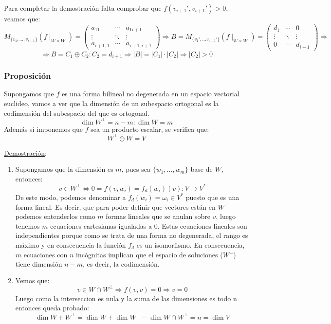 \documentclass[10pt,a4paper,openright]{book}
\begin{document}
\begin{itemize}
Para completar la demostración falta comprobar que $f(v_{i+1}',v_{i+1}')>0$, veamos que:
$$M_{\{v_1, ..., v_{i+1}\}}(f\mid_{W\times W}) = \begin{pmatrix} a_{11} & \cdots & a_{1i+1} \\ \vdots & \ddots & \vdots \\ a_{i+1,1} & \cdots & a_{i+1,i+1}\end{pmatrix}\Rightarrow B= M_{\{v_1', ... v_{i+1}'\}}(f\mid_{W\times W})=\begin{pmatrix} d_1 & \cdots & 0 \\ \vdots & \ddots & \vdots \\ 0 & \cdots & d_{i+1}\end{pmatrix}\Rightarrow$$
$$\Rightarrow B=C_1\oplus C_2: C_2 = d_{i+1}\Rightarrow |B| = |C_1| \cdot |C_2|\Rightarrow |C_2|>0$$
\end{itemize}

\subsubsection*{Proposición}
Supongamos que $f$ es una forma bilineal  no degenerada en un espacio vectorial euclideo, vamos a ver que la dimensión de un subespacio ortogonal es la codimensión del subespacio del que es ortogonal.
$$\dim W^\perp = n-m: \dim W = m$$
Además si imponemos que $f$ sea un producto escalar, se verifica que:
$$W^\perp \oplus W = V$$

\underline{Demostración}:
\begin{enumerate}
\item Supongamos que la dimensión es $m$, pues sea $\{w_1, ..., w_m\}$ base de $W$, entonces:
$$v\in W^\perp\Leftrightarrow 0 = f(v,w_i) = f_d(w_i)(v): V\rightarrow V^*$$
De este modo, podemos denominar a $f_d(w_i)=\omega_i\in V^*$ puesto que es una forma lineal. Es decir, que para poder definir que vectores están en $W^\perp$ podemos entenderlos como $m$ formas lineales que se anulan sobre $v$, luego tenemos $m$ ecuaciones cartesianas igualadas a 0. Estas ecuaciones lineales son independientes porque como se trata de una forma no degenerada, el rango es máximo y en consecuencia la función $f_d$ es un isomorfismo. En consecuencia, $m$ ecuaciones con $n$ incógnitas implican que el espacio de soluciones ($W^\perp$) tiene dimensión $n-m$, es decir, la codimensión.

\item Vemos que:
$$v\in W\cap W^\perp \Rightarrow f(v,v)=0\Rightarrow v = 0$$
Luego como la interseccion es nula y la suma de las dimensiones es todo n entonces queda probado:
$$\dim W+W^\perp = \dim W + \dim W^\perp -\dim W\cap W^\perp = n = \dim V$$

\end{enumerate}
\end{document}
